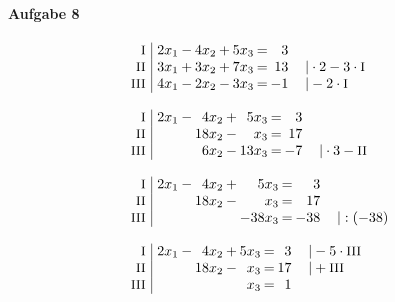 \paragraph{Aufgabe 8}
\begin{equation*}
\begin{array}{l}
\setlength{\arraycolsep}{1pt}
\begin{array}{r|rcrcrcrl}
    \text{\small I } &\; 2x_{1} & - & 4x_{2} & + & 5x_{3} & = &  3 &                                    \\
   \text{\small II } &\; 3x_{1} & + & 3x_{2} & + & 7x_{3} & = & 13 & \quad|\cdot2-3\cdot\text{\small I} \\
  \text{\small III } &\; 4x_{1} & - & 2x_{2} & - & 3x_{3} & = & -1 & \quad|-2\cdot\text{\small I}         
\end{array}
\\ \\
\setlength{\arraycolsep}{1pt}
\begin{array}{r|rcrcrcrl}
    \text{\small I } &\; 2x_{1} & - &  4x_{2} & + &  5x_{3} & = &  3 &                               \\
   \text{\small II } &\;        &   & 18x_{2} & - &   x_{3} & = & 17 &                               \\
  \text{\small III } &\;        &   &  6x_{2} & - & 13x_{3} & = & -7 & \quad|\cdot3-\text{\small II}   
\end{array}
\\ \\
\setlength{\arraycolsep}{1pt}
\begin{array}{r|rcrcrcrl}
    \text{\small I } &\; 2x_{1} & - &  4x_{2} & + &   5x_{3} & = &   3 &              \\
   \text{\small II } &\;        &   & 18x_{2} & - &    x_{3} & = &  17 &              \\
  \text{\small III } &\;        &   &         &   & -38x_{3} & = & -38 & \quad|:(-38)   
\end{array}
\\ \\
\setlength{\arraycolsep}{1pt}
\begin{array}{r|rcrcrcrl}
    \text{\small I } &\; 2x_{1} & - &  4x_{2} & + & 5x_{3} & = &  3 & \quad|-5\cdot\text{\small III} \\
   \text{\small II } &\;        &   & 18x_{2} & - &  x_{3} & = & 17 & \quad|+\text{\small III}       \\
  \text{\small III } &\;        &   &         &   &  x_{3} & = &  1 &                                  

\end{array}
\end{array}
\end{equation*}
